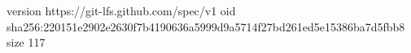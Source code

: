 version https://git-lfs.github.com/spec/v1
oid sha256:220151e2902e2630f7b4190636a5999d9a5714f27bd261ed5e15386ba7d5fbb8
size 117
